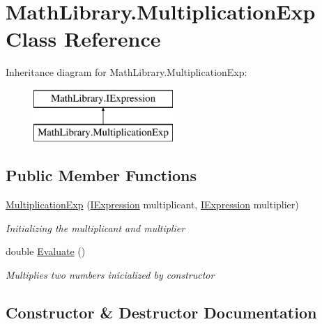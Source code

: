 \hypertarget{class_math_library_1_1_multiplication_exp}{}\section{Math\+Library.\+Multiplication\+Exp Class Reference}
\label{class_math_library_1_1_multiplication_exp}
Inheritance diagram for Math\+Library.\+Multiplication\+Exp\+:\begin{figure}[H]
\begin{center}
\leavevmode
\includegraphics[height=2.000000cm]{class_math_library_1_1_multiplication_exp}
\end{center}
\end{figure}
\subsection*{Public Member Functions}
\begin{DoxyCompactItemize}
\item 
\mbox{\hyperlink{class_math_library_1_1_multiplication_exp_a7e25e37bd650be2e0f13d0639e775a62}{Multiplication\+Exp}} (\mbox{\hyperlink{interface_math_library_1_1_i_expression}{I\+Expression}} multiplicant, \mbox{\hyperlink{interface_math_library_1_1_i_expression}{I\+Expression}} multiplier)
\begin{DoxyCompactList}\small\item\em Initializing the multiplicant and multiplier \end{DoxyCompactList}\item 
double \mbox{\hyperlink{class_math_library_1_1_multiplication_exp_a28b303e2c16035d0ca1e7eb57edeb262}{Evaluate}} ()
\begin{DoxyCompactList}\small\item\em Multiplies two numbers inicialized by constructor \end{DoxyCompactList}\end{DoxyCompactItemize}


\subsection{Constructor \& Destructor Documentation}
\mbox{\label{class_math_library_1_1_multiplication_exp_a7e25e37bd650be2e0f13d0639e775a62}} 
